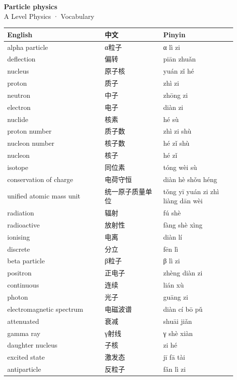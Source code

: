 \documentclass[11pt]{article}
\begin{document}
\begin{center}
  {\LARGE\bfseries Particle physics}\\[0.35em]
  {\large A Level Physics · Vocabulary}
\end{center}
\vspace{0.6em}

\begin{longtable}{@{}p{0.40\linewidth}p{0.24\linewidth}p{0.30\linewidth}@{}}
\toprule
\textbf{English} & \textbf{中文} & \textbf{Pinyin} \\
\midrule
\endhead
\bottomrule
\endlastfoot
alpha particle & α粒子 & α lì zi \\
deflection & 偏转 & piān zhuǎn \\
nucleus & 原子核 & yuán zǐ hé \\
proton & 质子 & zhì zi \\
neutron & 中子 & zhōng zi \\
electron & 电子 & diàn zi \\
nuclide & 核素 & hé sù \\
proton number & 质子数 & zhì zi shù \\
nucleon number & 核子数 & hé zǐ shù \\
nucleon & 核子 & hé zǐ \\
isotope & 同位素 & tóng wèi sù \\
conservation of charge & 电荷守恒 & diàn hè shǒu héng \\
unified atomic mass unit & 统一原子质量单位 & tǒng yī yuán zi zhì liàng dān wèi \\
radiation & 辐射 & fú shè \\
radioactive & 放射性 & fàng shè xìng \\
ionising & 电离 & diàn lí \\
discrete & 分立 & fēn lì \\
beta particle & β粒子 & β lì zi \\
positron & 正电子 & zhèng diàn zi \\
continuous & 连续 & lián xù \\
photon & 光子 & guāng zi \\
electromagnetic spectrum & 电磁波谱 & diàn cí bō pǔ \\
attenuated & 衰减 & shuāi jiǎn \\
gamma ray & γ射线 & γ shè xiàn \\
daughter nucleus & 子核 & zi hé \\
excited state & 激发态 & jī fā tài \\
antiparticle & 反粒子 & fǎn lì zi \\

\end{longtable}
\end{document}
